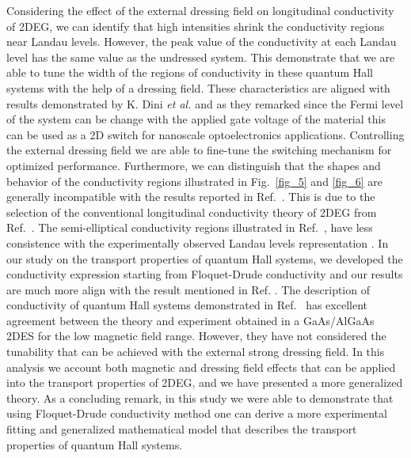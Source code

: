 Considering the effect of the external dressing field on longitudinal conductivity of 2DEG, we can identify that high intensities shrink the conductivity regions near Landau levels. However, the peak value of the conductivity at each Landau level has the same value as the undressed system. This demonstrate that we are able to tune the width of the regions of conductivity in these quantum Hall systems with the help of a dressing field.
These characteristics are aligned with results demonstrated by K. Dini \textit{et al.} \cite{dini16} and as they remarked since the Fermi level of the system can be change with the applied gate voltage of the material this can be used as a 2D switch for nanoscale optoelectronics applications. Controlling  the external dressing field we are able to fine-tune the switching mechanism for optimized performance.
Furthermore, we can distinguish that the shapes and behavior of the conductivity regions illustrated in Fig.~\ref{fig_5} and \ref{fig_6} are generally incompatible with the results reported in Ref.~\cite{dini16}. This is due to the selection of the conventional longitudinal conductivity theory of 2DEG from Ref.~\cite{ando74_1,ando82}. The semi-elliptical conductivity regions illustrated in Ref.~\cite{dini16,ando74_1,ando82}, have less consistence with the experimentally observed Landau levels representation \cite{endo09}.
In our study on the transport properties of quantum Hall systems, we developed the conductivity expression starting from Floquet-Drude conductivity \cite{wackerl20} and our results are much more align with the result mentioned in Ref. \cite{endo09}.
The description of conductivity of quantum Hall systems demonstrated in Ref.~\cite{endo09} has excellent agreement between the theory and experiment obtained in a GaAs/AlGaAs 2DES for the low magnetic field range. However, they have not considered the tunability that can be achieved with the external strong dressing field. In this analysis we account both magnetic and dressing field effects that can be applied into the transport properties of 2DEG, and we have presented a more generalized theory. As a concluding remark, in this study we were able to demonstrate that using Floquet-Drude conductivity method one can derive a more experimental fitting and generalized mathematical model that describes the transport properties of quantum Hall systems.
